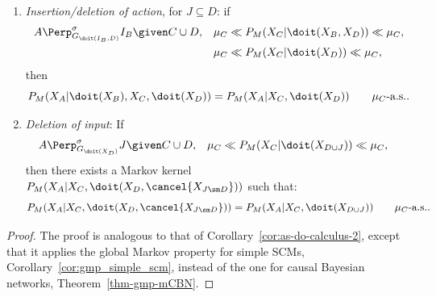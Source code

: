 \begin{Thm}
\begin{enumerate}
     \item \emph{Insertion/deletion of action}, for $J \subseteq D$: if
       \begin{align*} 
           A &\Perp^\sigma_{G_{\doit(I_B,D)}} I_B \given C  \cup D, &          
           \mu_C &\ll P_M(X_C|\doit(X_B,X_{D})) \ll \mu_C, \\
                 && \mu_C &\ll P_M(X_C|\doit(X_{D})) \ll \mu_C,
       \end{align*}
       then
       \[ P_M(X_A|\doit(X_B),X_C,\doit(X_{D})) = P_M(X_A|X_C,\doit(X_{D})) \qquad \mu_C\text{-a.s.}.\]
     \item \emph{Deletion of input}: 
         If 
         \begin{align*} 
           A &\Perp^\sigma_{G_{\doit(X_D)}} J \given C \cup D, &
             \mu_C &\ll P_M(X_C|\doit(X_{D\cup J})) \ll \mu_C,
         \end{align*}
         then there exists a Markov kernel $P_M(X_A|X_C,\doit(X_{D},\cancel{X_{J\sm D}}))$ such that:
         \[ P_M(X_A|X_C,\doit(X_{D},\cancel{X_{J\sm D}})) = P_M(X_A|X_C,\doit(X_{D \cup J})) \qquad \mu_C\text{-a.s.}. \]
    \end{enumerate}
\end{Thm}
\begin{proof}
  The proof is analogous to that of Corollary~\ref{cor:as-do-calculus-2}, except that it applies the global Markov property for simple SCMs, Corollary~\ref{cor:gmp_simple_scm}, instead of the one for causal Bayesian networks, Theorem~\ref{thm-gmp-mCBN}.
\end{proof}
